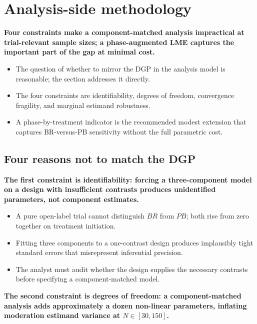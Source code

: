 \documentclass[
  11pt,
]{article}
\begin{document}
\section{Analysis-side methodology}\label{analysis-side-methodology}

\textbf{Four constraints make a component-matched analysis impractical at trial-relevant sample sizes; a phase-augmented LME captures the important part of the gap at minimal cost.}

\begin{itemize}\setlength{\itemsep}{2pt}\setlength{\parskip}{0pt}
\item The question of whether to mirror the DGP in the analysis model is reasonable; the section addresses it directly.
\item The four constraints are identifiability, degrees of freedom, convergence fragility, and marginal estimand robustness.
\item A phase-by-treatment indicator is the recommended modest extension that captures BR-versus-PB sensitivity without the full parametric cost.
\end{itemize}

\subsection{Four reasons not to match the DGP}\label{four-reasons-not-to-match-the-dgp}

\textbf{The first constraint is identifiability: forcing a three-component model on a design with insufficient contrasts produces unidentified parameters, not component estimates.}

\begin{itemize}\setlength{\itemsep}{2pt}\setlength{\parskip}{0pt}
\item A pure open-label trial cannot distinguish $BR$ from $PB$; both rise from zero together on treatment initiation.
\item Fitting three components to a one-contrast design produces implausibly tight standard errors that misrepresent inferential precision.
\item The analyst must audit whether the design supplies the necessary contrasts before specifying a component-matched model.
\end{itemize}

\textbf{The second constraint is degrees of freedom: a component-matched analysis adds approximately a dozen non-linear parameters, inflating moderation estimand variance at $N \in [30, 150]$.}
\end{document}

